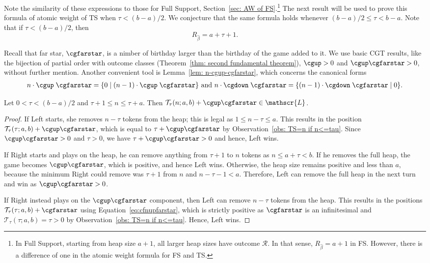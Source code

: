 \documentclass[oneside,reqno]{amsart}
\newcommand{\ts}{\mathcal{T}}
\newcommand{\lp}{\mathscr{L}}
\newcommand{\rp}{\mathscr{R}}
\newcommand{\hbeta}{\widehat\beta}
\begin{document}
Note the similarity of these expressions to those for {\sc Full Support}, Section~\ref{sec: AW of FS}.\footnote{In {\sc Full Support}, starting from heap size $a+1$, all larger heap sizes have outcome $\rp$. In that sense, $R_{\hbeta}=a+1$ in {\sc FS}. However, there is a difference of one in the atomic weight formula for {\sc FS} and {\sc TS}.} 
The next result will be used to prove this formula of atomic weight of {\sc TS} when $\tau<(b-a)/2$. We conjecture that the same formula holds whenever $(b-a)/2\le \tau<b-a$. Note that if $\tau<(b-a)/2$, then $$R_{\hbeta}=a+\tau+1.$$ 

Recall that far star, $\cgfarstar$, is a nimber of birthday larger than the birthday of the game added to it. 
We use basic CGT results, like the bijection of partial order with outcome classes (Theorem~\ref{thm: second fundamental theorem}), $\cgup>0$ and $\cgup\cgfarstar>0$, without further mention. Another convenient tool is Lemma~\ref{lem: n-cgup-cgfarstar}, which concerns the canonical forms  
\begin{align}\label{eq:cfnupfarstar}
n\cdot\cgup\;\cgfarstar=\{0\mid (n-1)\cdot\cgup\;\cgfarstar\} \text{ and } n\cdot\cgdown\;\cgfarstar=\{(n-1)\cdot\cgdown\;\cgfarstar\mid0\}.
\end{align}

\begin{lemma}\label{lem: help to shorten main theorem}
    Let $0<\tau<(b-a)/2$ and $\tau+1\le n\le \tau+a$. Then $\ts_\tau(n;a,b)+\cgup\cgfarstar\in \lp$.%
\end{lemma}
\begin{proof}
    If Left starts, she removes $n-\tau$ tokens from the heap; this is legal as $1\le n-\tau\le a$. This results in the position  $\ts_\tau(\tau;a,b)+\cgup\cgfarstar$, which is equal to $\tau+\cgup\cgfarstar$ by Observation~\ref{obs: TS=n if n<=tau}. Since $\cgup\cgfarstar>0$ and $\tau>0$, we have $\tau+\cgup\cgfarstar>0$ and hence, Left wins. %

    If Right starts and plays on the heap, he can remove anything from $\tau+1$ to $n$ tokens as $n\le a+\tau< b$. If he removes the full heap, the game becomes $\cgup\cgfarstar$, which is positive, and hence Left wins. Otherwise, the heap size remains positive and less than $a$, because the minimum Right could remove was $\tau+1$ from $n$ and $n-\tau-1< a$. Therefore, Left can remove the full heap in the next turn and win as $\cgup\cgfarstar>0$. 

    If Right instead plays on the  $\cgup\cgfarstar$ component, then Left can remove $n-\tau$ tokens from the heap. This results in the positions $\ts_\tau(\tau;a,b)+\cgfarstar$ using Equation~\eqref{eq:cfnupfarstar}, which is strictly positive as $\cgfarstar$ is an infinitesimal and $\ts_\tau(\tau;a,b)=\tau>0$ by Observation~\ref{obs: TS=n if n<=tau}. Hence, Left wins. 
\end{proof}
\end{document}

